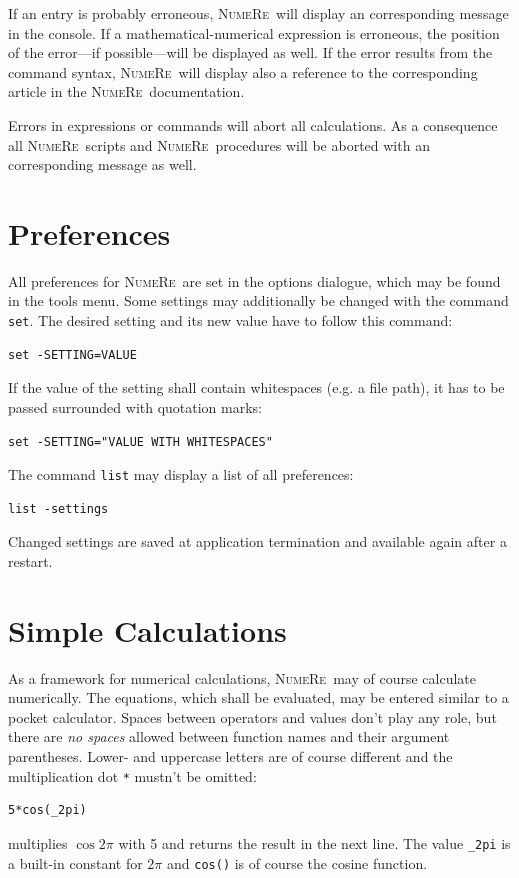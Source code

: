 \documentclass[DIV=14,headsepline,footsepline]{scrbook}
\newcommand{\NR}{\textsc{Nu\-me\-Re}}
\begin{document}
				If an entry is probably erroneous, \NR\ will display an corresponding message in the console. If a mathematical-numerical expression is erroneous, the position of the error---if possible---will be displayed as well. If the error results from the command syntax, \NR\ will display also a reference to the corresponding article in the \NR\ documentation.
				
				Errors in expressions or commands will abort all calculations. As a consequence all \NR\ scripts and \NR\ procedures will be aborted with an corresponding message as well.
			\section{Preferences}
				All preferences for \NR\ are set in the options dialogue, which may be found in the tools menu. Some settings may additionally be changed with the command \lstinline+set+. The desired setting and its new value have to follow this command:
				\begin{lstlisting}
set -SETTING=VALUE
				\end{lstlisting}
				If the value of the setting shall contain whitespaces (e.g. a file path), it has to be passed surrounded with quotation marks:
				\begin{lstlisting}
set -SETTING="VALUE WITH WHITESPACES"
				\end{lstlisting}
				The command \lstinline+list+ may display a list of all preferences:
				\begin{lstlisting}
list -settings
				\end{lstlisting}
				Changed settings are saved at application termination and available again after a restart.
			\section{Simple Calculations}
				As a framework for numerical calculations, \NR\ may of course calculate numerically. The equations, which shall be evaluated, may be entered similar to a pocket calculator. Spaces between operators and values don't play any role, but there are \emph{no spaces} allowed between function names and their argument parentheses. Lower- and uppercase letters are of course different and the multiplication dot \lstinline+*+ mustn't be omitted:
				\begin{lstlisting}
5*cos(_2pi)
				\end{lstlisting}
				multiplies $\cos2\pi$ with 5 and returns the result in the next line. The value \lstinline+_2pi+ is a built-in constant for $2\pi$ and \lstinline+cos()+ is of course the cosine function.
\end{document}
